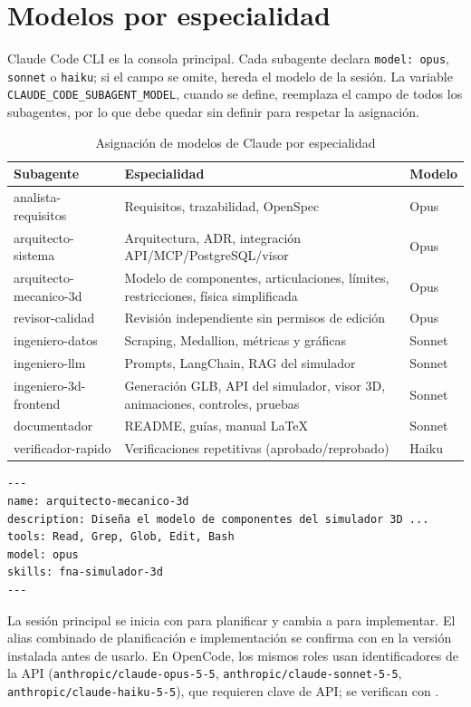 \section{Modelos por especialidad}\label{sec:modelos-especialidad}
Claude Code CLI es la consola principal. Cada subagente declara \texttt{model: opus}, \texttt{sonnet} o
\texttt{haiku}; si el campo se omite, hereda el modelo de la sesión. La variable
\texttt{CLAUDE\_CODE\_SUBAGENT\_MODEL}, cuando se define, reemplaza el campo de todos los subagentes, por lo que
debe quedar sin definir para respetar la asignación.
\begin{table}[H]\centering\small
\caption{Asignación de modelos de Claude por especialidad}\label{tab:modelos-especialidad}
\begin{tabularx}{\linewidth}{@{}P{3.4cm} X P{1.4cm}@{}}\toprule
Subagente & Especialidad & Modelo\\\midrule
analista-requisitos & Requisitos, trazabilidad, OpenSpec & Opus\\
arquitecto-sistema & Arquitectura, ADR, integración API/MCP/PostgreSQL/visor & Opus\\
arquitecto-mecanico-3d & Modelo de componentes, articulaciones, límites, restricciones, física simplificada & Opus\\
revisor-calidad & Revisión independiente sin permisos de edición & Opus\\
ingeniero-datos & Scraping, Medallion, métricas y gráficas & Sonnet\\
ingeniero-llm & Prompts, LangChain, RAG del simulador & Sonnet\\
ingeniero-3d-frontend & Generación GLB, API del simulador, visor 3D, animaciones, controles, pruebas & Sonnet\\
documentador & README, guías, manual LaTeX & Sonnet\\
verificador-rapido & Verificaciones repetitivas (aprobado/reprobado) & Haiku\\\bottomrule
\end{tabularx}
\end{table}
\begin{lstlisting}[style=txt]
---
name: arquitecto-mecanico-3d
description: Diseña el modelo de componentes del simulador 3D ...
tools: Read, Grep, Glob, Edit, Bash
model: opus
skills: fna-simulador-3d
---
\end{lstlisting}
La sesión principal se inicia con  para planificar y cambia a  para
implementar. El alias combinado de planificación e implementación se confirma con  en la versión
instalada antes de usarlo. En OpenCode, los mismos roles usan identificadores de la API
(\texttt{anthropic/claude-opus-5-5}, \texttt{anthropic/claude-sonnet-5-5}, \texttt{anthropic/claude-haiku-5-5}),
que requieren clave de API; se verifican con .

